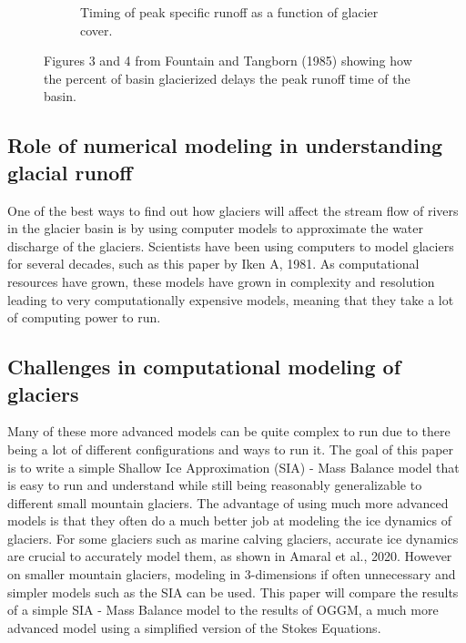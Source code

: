 \documentclass{article}
\begin{document}
\begin{figure}[h]
\begin{subfigure}[b]{0.45\textwidth}
        \caption{Timing of peak specific runoff as a function of glacier cover.}
        \label{fig:subfig2}
    \end{subfigure}
    \caption{Figures 3 and 4 from Fountain and Tangborn (1985) showing how the percent of basin glacierized delays the peak runoff time of the basin.}
    \label{fig:main_figure}
\end{figure}
\FloatBarrier
\subsection{Role of numerical modeling in understanding glacial runoff}
One of the best ways to find out how glaciers will affect the stream flow of rivers in the glacier basin is by using computer models to 
approximate the water discharge of the glaciers. Scientists have been using computers to model glaciers for several decades, such as this 
paper by Iken A, 1981. As computational resources have grown, these models have grown in complexity and resolution leading to very 
computationally expensive models, meaning that they take a lot of computing power to run.
\subsection{Challenges in computational modeling of glaciers}
Many of these more advanced models can be quite complex to run due to there being a lot of different configurations and ways to run it. The 
goal of this paper is to write a simple Shallow Ice Approximation (SIA) - Mass Balance model that is easy to run and understand while still 
being reasonably generalizable to different small mountain glaciers. The advantage of using much more advanced models is that they often do 
a much better job at modeling the ice dynamics of glaciers. For some glaciers such as marine calving glaciers, accurate ice dynamics are 
crucial to accurately model them, as shown in Amaral et al., 2020. However on smaller mountain glaciers, modeling in 3-dimensions if often 
unnecessary and simpler models such as the SIA can be used. This paper will compare the results of a simple SIA - Mass Balance model to the 
results of OGGM, a much more advanced model using a simplified version of the Stokes Equations.
\end{document}
